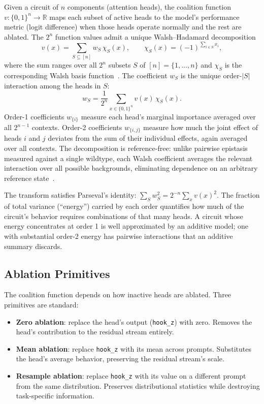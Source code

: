 \documentclass{article}
\begin{document}
Given a circuit of $n$ components (attention heads), the coalition
function $v: \{0,1\}^n \to \mathbb{R}$ maps each subset of active heads
to the model's performance metric (logit difference) when those heads
operate normally and the rest are ablated. The $2^n$ function values
admit a unique Walsh--Hadamard decomposition
\begin{equation}
  v(x) = \sum_{S \subseteq [n]} w_S \,\chi_S(x),
  \qquad
  \chi_S(x) = (-1)^{\sum_{i \in S} x_i},
\end{equation}
where the sum ranges over all $2^n$ subsets $S$ of $[n] = \{1, \ldots, n\}$
and $\chi_S$ is the corresponding Walsh basis
function~\citep{poelwijk2016context}. The coefficient $w_S$ is the
unique order-$|S|$ interaction among the heads in $S$:
\begin{equation}
  w_S = \frac{1}{2^n} \sum_{x \in \{0,1\}^n} v(x)\,\chi_S(x).
  \label{eq:walsh-coeff}
\end{equation}
Order-1 coefficients $w_{\{i\}}$ measure each head's marginal
importance averaged over all $2^{n-1}$ contexts. Order-2 coefficients
$w_{\{i,j\}}$ measure how much the joint effect of heads $i$ and $j$
deviates from the sum of their individual effects, again averaged over
all contexts. The decomposition is reference-free: unlike pairwise
epistasis measured against a single wildtype, each Walsh coefficient
averages the relevant interaction over all possible backgrounds,
eliminating dependence on an arbitrary reference
state~\citep{poelwijk2019learning}.

The transform satisfies Parseval's identity: $\sum_S w_S^2 = 2^{-n}
\sum_x v(x)^2$. The fraction of total variance (``energy'') carried by
each order quantifies how much of the circuit's behavior requires
combinations of that many heads. A circuit whose energy concentrates at
order 1 is well approximated by an additive model; one with substantial
order-2 energy has pairwise interactions that an additive summary
discards.

\subsection{Ablation Primitives}
\label{sec:ablation-primitives}

The coalition function depends on how inactive heads are ablated.
Three primitives are standard:

\begin{itemize}
\item \textbf{Zero ablation}: replace the head's output
  (\texttt{hook\_z}) with zero. Removes the head's contribution to the
  residual stream entirely.

\item \textbf{Mean ablation}: replace \texttt{hook\_z} with its mean
  across prompts. Substitutes the head's average behavior, preserving
  the residual stream's scale.

\item \textbf{Resample ablation}: replace \texttt{hook\_z} with its
  value on a different prompt from the same distribution. Preserves
  distributional statistics while destroying task-specific information.
\end{itemize}
\end{document}

